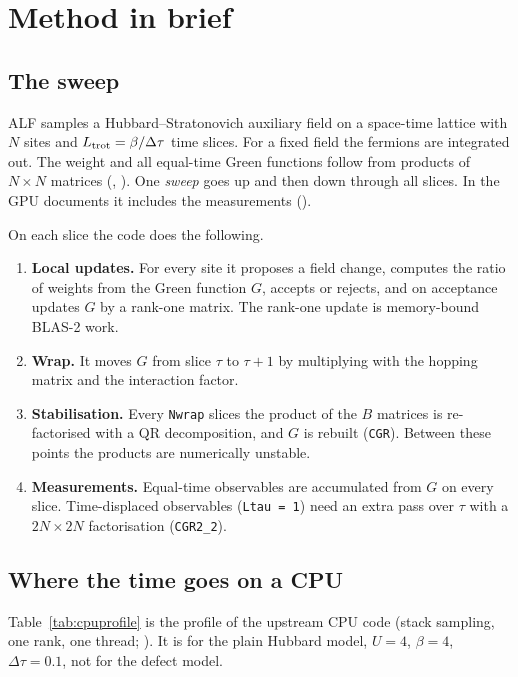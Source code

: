 \section{Method in brief}
\label{sec:method}

\subsection{The sweep}

ALF samples a Hubbard--Stratonovich auxiliary field on a space-time lattice with $N$ sites and $L_{\rm trot}=\beta/\Delta\tau$ time slices. For a fixed field the fermions are integrated out. The weight and all equal-time Green functions follow from products of $N\times N$ matrices (, ). One \emph{sweep} goes up and then down through all slices. In the GPU documents it includes the measurements ().

On each slice the code does the following.
\begin{enumerate}
\item \textbf{Local updates.} For every site it proposes a field change, computes the ratio of weights from the Green function $G$, accepts or rejects, and on acceptance updates $G$ by a rank-one matrix. The rank-one update is memory-bound BLAS-2 work.
\item \textbf{Wrap.} It moves $G$ from slice $\tau$ to $\tau+1$ by multiplying with the hopping matrix and the interaction factor.
\item \textbf{Stabilisation.} Every \texttt{Nwrap} slices the product of the $B$ matrices is re-factorised with a QR decomposition, and $G$ is rebuilt (\texttt{CGR}). Between these points the products are numerically unstable.
\item \textbf{Measurements.} Equal-time observables are accumulated from $G$ on every slice. Time-displaced observables (\texttt{Ltau = 1}) need an extra pass over $\tau$ with a $2N\times2N$ factorisation (\texttt{CGR2\_2}).
\end{enumerate}

\subsection{Where the time goes on a CPU}

Table~\ref{tab:cpuprofile} is the profile of the upstream CPU code (stack sampling, one rank, one thread; ). It is for the plain Hubbard model, $U=4$, $\beta=4$, $\Delta\tau=0.1$, not for the defect model.


